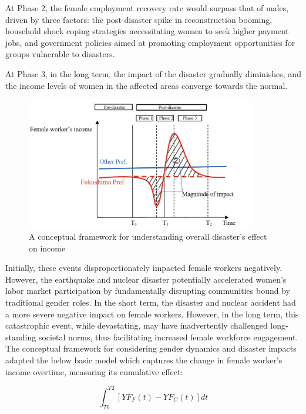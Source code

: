 \documentclass[a4paper,12pt]{article}
\begin{document}
At Phase 2, the female employment recovery rate would surpass that of males, driven by three factors: the post-disaster spike in reconstruction booming, household shock coping strategies necessitating women to seek higher payment jobs, and government policies aimed at promoting employment opportunities for groups vulnerable to disasters.

At Phase 3, in the long term, the impact of the disaster gradually diminishes, and the income levels of women in the affected areas converge towards the normal.


\begin{figure}[h!]
    \centering
    \includegraphics[width=0.9\textwidth]{A conceptual model.jpeg}  %
    \caption{A conceptual framework for understanding overall disaster's effect on income}
    \label{fig:conceptual_model}
\end{figure}


Initially, these events disproportionately impacted female workers negatively. However, the earthquake and nuclear disaster potentially accelerated women's labor market participation by fundamentally disrupting communities bound by traditional gender roles. In the short term, the disaster and nuclear accident had a more severe negative impact on female workers. However, in the long term, this catastrophic event, while devastating, may have inadvertently challenged long-standing societal norms, thus facilitating increased female workforce engagement. The conceptual framework for considering gender dynamics and disaster impacts adapted the below basic model which captures the change in female worker's income overtime, measuring its cumulative effect:

\begin{equation}
\int_{T0}^{T2} [YF_F(t) - YF_C(t)] dt
\end{equation}
\end{document}
